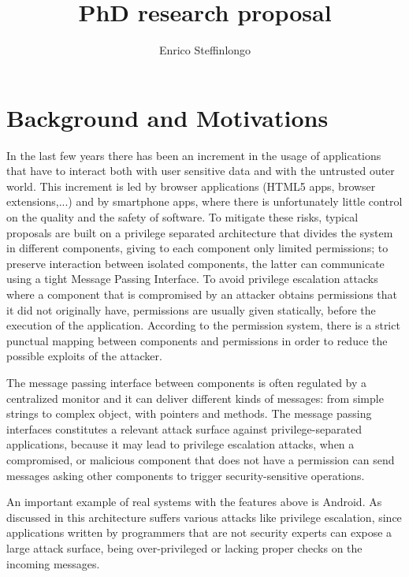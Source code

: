 \documentclass[10pt,a4paper]{article}
\author{Enrico Steffinlongo}
\title{PhD research proposal}
\begin{document}
\maketitle
\section*{Background and Motivations}
In the last few years there has been an increment in the usage of applications that have to interact both with user sensitive data and with the untrusted outer world. This increment is led by browser applications (HTML5 apps, browser extensions,...) and by smartphone apps, where there is unfortunately little control on the quality and the safety of software. To mitigate these risks, typical proposals are built on a privilege separated architecture that divides the system in different components, giving to each component only limited permissions; to preserve interaction between isolated components, the latter can communicate using a tight Message Passing Interface. To avoid privilege escalation attacks where a component that is compromised by an attacker obtains permissions that it did not originally have, permissions are usually given statically, before the execution of the application. According to the permission system, there is a strict punctual mapping between components and permissions in order to reduce the possible exploits of the attacker.

The message passing interface between components is often regulated by a centralized monitor and it can deliver different kinds of messages: from simple strings to complex object, with pointers and methods. The message passing interfaces constitutes a relevant attack surface against privilege-separated applications, because it may lead to privilege escalation attacks, when a compromised, or malicious component that does not have a permission can send messages asking other components to trigger security-sensitive operations.

An important example of real systems with the features above is Android. As discussed in \cite{AndroidMPI,AndroidPermissions,AndroidPermission,AndroidPrivilegeEscalation,AndroidRedelegation,Lintent} this architecture suffers various attacks like privilege escalation, since applications written by programmers that are not security experts can expose a large attack surface, being over-privileged or lacking proper checks on the incoming messages.
\end{document}
